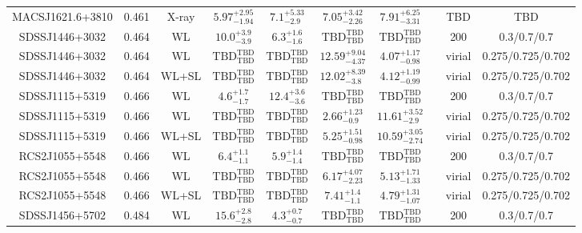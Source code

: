 \begin{table}
\begin{tabular}{cccccccccc}
MACSJ1621.6+3810 & 0.461 & X-ray & ${5.97}^{+2.95}_{-1.94}$ & ${7.1}^{+5.33}_{-2.9}$ & ${7.05}^{+3.42}_{-2.26}$ & ${7.91}^{+6.25}_{-3.31}$ & \citet{SC06.1} & TBD & TBD \\
SDSSJ1446+3032 & 0.464 & WL & ${10.0}^{+3.9}_{-3.9}$ & ${6.3}^{+1.6}_{-1.6}$ & ${\mathrm{TBD}}^{\mathrm{TBD}}_{\mathrm{TBD}}$ & ${\mathrm{TBD}}^{\mathrm{TBD}}_{\mathrm{TBD}}$ & \citet{SE14.1} & 200 & 0.3/0.7/0.7 \\
SDSSJ1446+3032 & 0.464 & WL & ${\mathrm{TBD}}^{\mathrm{TBD}}_{\mathrm{TBD}}$ & ${\mathrm{TBD}}^{\mathrm{TBD}}_{\mathrm{TBD}}$ & ${12.59}^{+9.04}_{-4.37}$ & ${4.07}^{+1.17}_{-0.98}$ & \citet{OG12.1} & virial & 0.275/0.725/0.702 \\
SDSSJ1446+3032 & 0.464 & WL+SL & ${\mathrm{TBD}}^{\mathrm{TBD}}_{\mathrm{TBD}}$ & ${\mathrm{TBD}}^{\mathrm{TBD}}_{\mathrm{TBD}}$ & ${12.02}^{+8.39}_{-3.8}$ & ${4.12}^{+1.19}_{-0.99}$ & \citet{OG12.1} & virial & 0.275/0.725/0.702 \\
SDSSJ1115+5319 & 0.466 & WL & ${4.6}^{+1.7}_{-1.7}$ & ${12.4}^{+3.6}_{-3.6}$ & ${\mathrm{TBD}}^{\mathrm{TBD}}_{\mathrm{TBD}}$ & ${\mathrm{TBD}}^{\mathrm{TBD}}_{\mathrm{TBD}}$ & \citet{SE14.1} & 200 & 0.3/0.7/0.7 \\
SDSSJ1115+5319 & 0.466 & WL & ${\mathrm{TBD}}^{\mathrm{TBD}}_{\mathrm{TBD}}$ & ${\mathrm{TBD}}^{\mathrm{TBD}}_{\mathrm{TBD}}$ & ${2.66}^{+1.23}_{-0.9}$ & ${11.61}^{+3.52}_{-2.9}$ & \citet{OG12.1} & virial & 0.275/0.725/0.702 \\
SDSSJ1115+5319 & 0.466 & WL+SL & ${\mathrm{TBD}}^{\mathrm{TBD}}_{\mathrm{TBD}}$ & ${\mathrm{TBD}}^{\mathrm{TBD}}_{\mathrm{TBD}}$ & ${5.25}^{+1.51}_{-0.98}$ & ${10.59}^{+3.05}_{-2.74}$ & \citet{OG12.1} & virial & 0.275/0.725/0.702 \\
RCS2J1055+5548 & 0.466 & WL & ${6.4}^{+1.1}_{-1.1}$ & ${5.9}^{+1.4}_{-1.4}$ & ${\mathrm{TBD}}^{\mathrm{TBD}}_{\mathrm{TBD}}$ & ${\mathrm{TBD}}^{\mathrm{TBD}}_{\mathrm{TBD}}$ & \citet{SE14.1} & 200 & 0.3/0.7/0.7 \\
RCS2J1055+5548 & 0.466 & WL & ${\mathrm{TBD}}^{\mathrm{TBD}}_{\mathrm{TBD}}$ & ${\mathrm{TBD}}^{\mathrm{TBD}}_{\mathrm{TBD}}$ & ${6.17}^{+4.07}_{-2.23}$ & ${5.13}^{+1.71}_{-1.33}$ & \citet{OG12.1} & virial & 0.275/0.725/0.702 \\
RCS2J1055+5548 & 0.466 & WL+SL & ${\mathrm{TBD}}^{\mathrm{TBD}}_{\mathrm{TBD}}$ & ${\mathrm{TBD}}^{\mathrm{TBD}}_{\mathrm{TBD}}$ & ${7.41}^{+1.4}_{-1.1}$ & ${4.79}^{+1.31}_{-1.07}$ & \citet{OG12.1} & virial & 0.275/0.725/0.702 \\
SDSSJ1456+5702 & 0.484 & WL & ${15.6}^{+2.8}_{-2.8}$ & ${4.3}^{+0.7}_{-0.7}$ & ${\mathrm{TBD}}^{\mathrm{TBD}}_{\mathrm{TBD}}$ & ${\mathrm{TBD}}^{\mathrm{TBD}}_{\mathrm{TBD}}$ & \citet{SE14.1} & 200 & 0.3/0.7/0.7 \\

\end{tabular}
\end{table}

